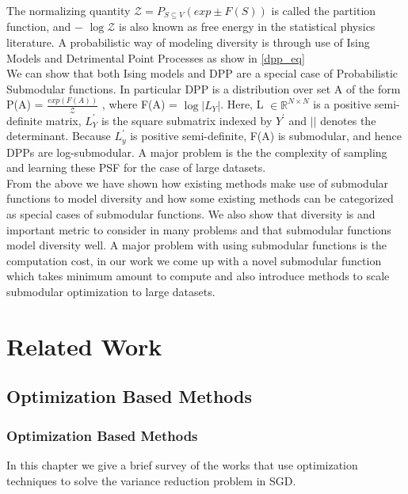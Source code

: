 \documentclass[a4paper,twoside]{iiththesis}
\theoremstyle{definition}
\theoremstyle{definition}
\theoremstyle{remark}
\begin{document}
  The normalizing quantity $\mathcal{Z} = P_{S\subseteq V} (exp \pm  F(S))$ is called the partition function, and − $\log \mathcal{Z}$ is also known as free energy in the statistical physics literature. 
A probabilistic way of modeling diversity is through use of Ising Models and Detrimental Point Processes as show in \ref{dpp_eq}\\
We can show that both Ising models and DPP are a special case of Probabilistic Submodular functions. 
In particular DPP is a distribution over set A of the form
P(A) = $\frac{exp(F(A))}{\mathcal{Z}}$ , where F(A) = $\log |L_Y|$. Here, L $\in \mathbb{R}
^{N \times N}$ is a positive semi-definite matrix, $L_Y^{'}$ is the square submatrix indexed by $Y^{'}$ and $|   |$ denotes the determinant. Because $L_y^{'}$ is positive semi-definite, F(A) is submodular, and hence DPPs are log-submodular. A major problem is the the complexity of sampling and learning these PSF for the case of large datasets.\\

From the above we have shown how existing methods make use of submodular functions to model diversity and how some existing methods can be categorized as special cases of submodular functions. We also show that diversity is and important metric to consider in many problems and that submodular functions model diversity well. A major problem with using submodular functions is the computation cost, in our work we come up with a novel submodular function which takes minimum amount to compute and also introduce methods to scale submodular optimization to large datasets.

\part{Related Work}\label{related work}
\chapter{Optimization Based Methods}
\section{Optimization Based Methods}
In this chapter we give a brief survey of the works that use optimization techniques to solve the variance reduction problem in SGD.\\
\end{document}
